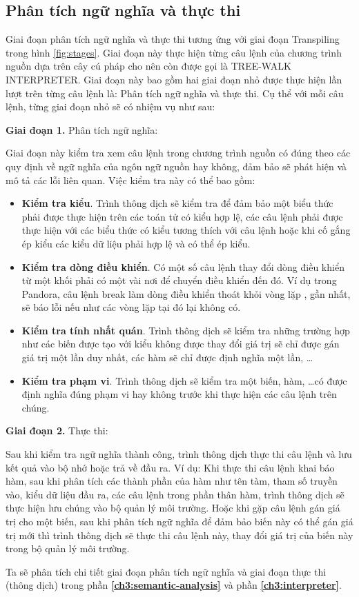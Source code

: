 \subsection{Phân tích ngữ nghĩa và thực thi}

    Giai đoạn phân tích ngữ nghĩa và thực thi tương ứng với giai đoạn Transpiling trong hình \ref{fig:stages}. Giai đoạn này thực hiện từng câu lệnh của chương trình nguồn dựa trên cây cú pháp cho nên còn được gọi là TREE-WALK INTERPRETER. Giai đoạn này bao gồm hai giai đoạn nhỏ được thực hiện lần lượt trên từng câu lệnh là: Phân tích ngữ nghĩa và thực thi. Cụ thể với mỗi câu lệnh, từng giai đoạn nhỏ sẽ có nhiệm vụ như sau:

\textbf{Giai đoạn 1.} Phân tích ngữ nghĩa: 

    Giai đoạn này kiểm tra xem câu lệnh trong chương trình nguồn có đúng theo các quy định về ngữ nghĩa của ngôn ngữ nguồn hay không, đảm bảo sẽ phát hiện và mô tả các lỗi liên quan. Việc kiểm tra này có thể bao gồm: 
\begin{itemize}
    \item \textbf{Kiểm tra kiểu}. Trình thông dịch sẽ kiểm tra để đảm bảo một biểu thức phải được thực hiện trên các toán tử có kiểu hợp lệ, các câu lệnh phải được thực hiện với các biểu thức có kiểu tương thích với câu lệnh hoặc khi cố gắng ép kiểu các kiểu dữ liệu phải hợp lệ và có thể ép kiểu.
    \item \textbf{Kiểm tra dòng điều khiển}. Có một số câu lệnh thay đổi dòng điều khiển từ một khối phải có một vài nơi để chuyển điều khiển đến đó. Ví dụ trong Pandora, câu lệnh break làm dòng điều khiển thoát khỏi vòng lặp ,  gần nhất, sẽ báo lỗi nếu như các vòng lặp tại đó lại không có.
    \item \textbf{Kiểm tra tính nhất quán}. Trình thông dịch sẽ kiểm tra những trường hợp như các biến được tạo với kiểu không được thay đổi giá trị sẽ chỉ được gán giá trị một lần duy nhất, các hàm sẽ chỉ được định nghĩa một lần, \dots
    \item \textbf{Kiểm tra phạm vi}. Trình thông dịch sẽ kiểm tra một biến, hàm, \dots có được định nghĩa đúng phạm vi hay không trước khi thực hiện các câu lệnh trên chúng.
\end{itemize}

\textbf{Giai đoạn 2.} Thực thi: 

    Sau khi kiểm tra ngữ nghĩa thành công, trình thông dịch thực thi câu lệnh và lưu kết quả vào bộ nhớ hoặc trả về đầu ra. Ví dụ: Khi thực thi câu lệnh khai báo hàm, sau khi phân tích các thành phần của hàm như tên tàm, tham số truyền vào, kiểu dữ liệu đầu ra, các câu lệnh trong phần thân hàm, trình thông dịch sẽ thực hiện lưu chúng vào bộ quản lý môi trường. Hoặc khi gặp câu lệnh gán giá trị cho một biến, sau khi phân tích ngữ nghĩa để đảm bảo biến này có thể gán giá trị mới thì trình thông dịch sẽ thực thi câu lệnh này, thay đổi giá trị của biến này trong bộ quản lý môi trường.

    Ta sẽ phân tích chi tiết giai đoạn phân tích ngữ nghĩa và giai đoạn thực thi (thông dịch) trong phần \textbf{\ref{ch3:semantic-analysis}} và phần \textbf{\ref{ch3:interpreter}}.
